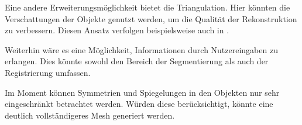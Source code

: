 Eine andere Erweiterungsmöglichkeit bietet die Triangulation.
Hier könnten die Verschattungen der Objekte genutzt werden, um die Qualität der Rekonstruktion zu verbessern.
Diesen Ansatz verfolgen beispielsweise auch \citeauthor{kazhdan2020poisson} in \cite{kazhdan2020poisson}.

Weiterhin wäre es eine Möglichkeit, Informationen durch Nutzereingaben zu erlangen.
Dies könnte sowohl den Bereich der Segmentierung als auch der Registrierung umfassen.

Im Moment können Symmetrien und Spiegelungen in den Objekten nur sehr eingeschränkt betrachtet werden.
Würden diese berücksichtigt, könnte eine deutlich vollständigeres Mesh generiert werden.


